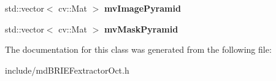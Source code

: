 \begin{DoxyCompactItemize}
\item 
std\+::vector$<$ cv\+::\+Mat $>$ {\bfseries mv\+Image\+Pyramid}\hypertarget{classMultiColSLAM_1_1mdBRIEFextractorOct_a59a2f3e13d8915a9474b49861e402ce4}{}\label{classMultiColSLAM_1_1mdBRIEFextractorOct_a59a2f3e13d8915a9474b49861e402ce4}

\item 
std\+::vector$<$ cv\+::\+Mat $>$ {\bfseries mv\+Mask\+Pyramid}\hypertarget{classMultiColSLAM_1_1mdBRIEFextractorOct_aab8acf05aa0bfa79096550ca98799a18}{}\label{classMultiColSLAM_1_1mdBRIEFextractorOct_aab8acf05aa0bfa79096550ca98799a18}

\end{DoxyCompactItemize}


The documentation for this class was generated from the following file\+:\begin{DoxyCompactItemize}
\item 
include/md\+B\+R\+I\+E\+Fextractor\+Oct.\+h\end{DoxyCompactItemize}
